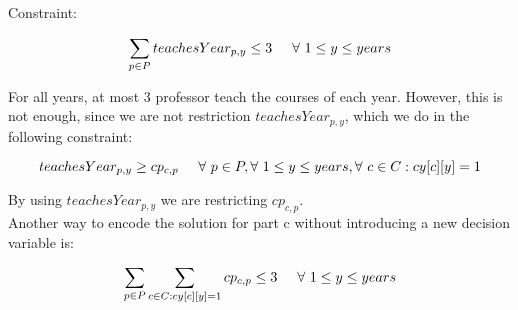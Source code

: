 \documentclass[11pt, oneside]{article}   	%
\begin{document}
Constraint:

$$\sum_{p \in P} teachesYear_{p,y} \leq 3 \hspace{5 mm} \forall{}\ 1 \leq y \leq years$$

For all years, at most 3 professor teach the courses of each year. However, this is not enough, since we are not restriction $teachesYear_{p,y}$, which we do in the following constraint:

$$teachesYear_{p,y} \geq cp_{c,p} \hspace{5 mm}  \forall{}\ p \in P, \forall{}\ 1 \leq y \leq years, \forall{}\ c \in C : cy[c][y] = 1$$

By using $teachesYear_{p,y}$ we are restricting $cp_{c,p}$.\\

Another way to encode the solution for part c without introducing a new decision variable is:

$$\sum_{p \in P} \sum_{c \in C : cy[c][y] = 1} cp_{c,p} \leq 3 \hspace{5 mm}  \forall{}\ 1 \leq y \leq years$$
















































 
\end{document}

